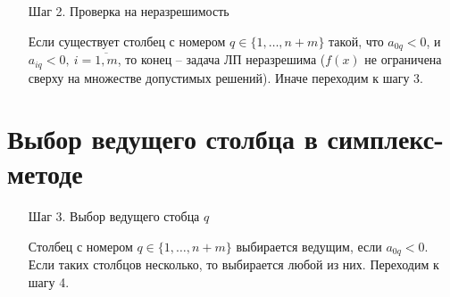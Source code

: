 \begin{enumerate}
	\item[Шаг 2.] Проверка на неразрешимость

	      Если существует столбец с номером $q \in \{1,\ldots,n+m\}$ такой, что $a_{0q} < 0$, и $a_{iq} < 0, \ i = \overline{1,m}$, то конец -- задача ЛП неразрешима ($f(x)$ не ограничена сверху на множестве допустимых решений). Иначе переходим к шагу 3.
\end{enumerate}

\section{Выбор ведущего столбца в симплекс-методе}

\begin{enumerate}
	\item[Шаг 3.] Выбор ведущего стобца $q$

	      Столбец с номером $q \in \{1,\ldots,n+m\}$ выбирается ведущим, если $a_{0q} < 0$. Если таких столбцов несколько, то выбирается любой из них. Переходим к шагу 4.
\end{enumerate}
